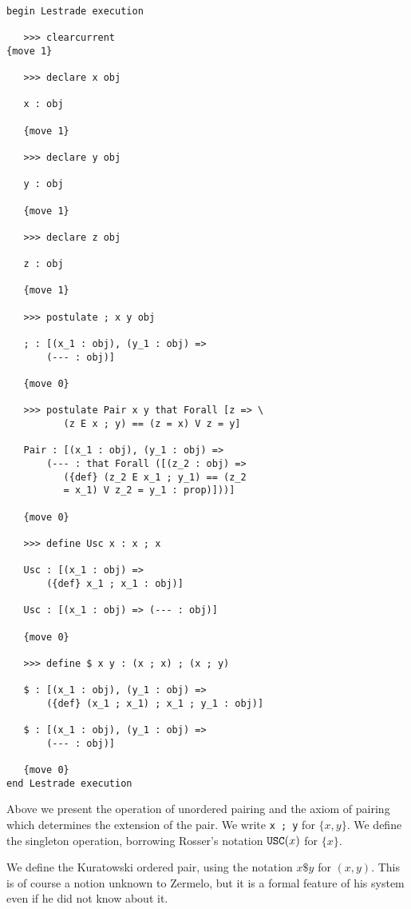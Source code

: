 \documentclass[12pt]{article}
\begin{document}
\begin{verbatim}

begin Lestrade execution

   >>> clearcurrent
{move 1}

   >>> declare x obj

   x : obj

   {move 1}

   >>> declare y obj

   y : obj

   {move 1}

   >>> declare z obj

   z : obj

   {move 1}

   >>> postulate ; x y obj

   ; : [(x_1 : obj), (y_1 : obj) => 
       (--- : obj)]

   {move 0}

   >>> postulate Pair x y that Forall [z => \
          (z E x ; y) == (z = x) V z = y]

   Pair : [(x_1 : obj), (y_1 : obj) => 
       (--- : that Forall ([(z_2 : obj) => 
          ({def} (z_2 E x_1 ; y_1) == (z_2 
          = x_1) V z_2 = y_1 : prop)]))]

   {move 0}

   >>> define Usc x : x ; x

   Usc : [(x_1 : obj) => 
       ({def} x_1 ; x_1 : obj)]

   Usc : [(x_1 : obj) => (--- : obj)]

   {move 0}

   >>> define $ x y : (x ; x) ; (x ; y)

   $ : [(x_1 : obj), (y_1 : obj) => 
       ({def} (x_1 ; x_1) ; x_1 ; y_1 : obj)]

   $ : [(x_1 : obj), (y_1 : obj) => 
       (--- : obj)]

   {move 0}
end Lestrade execution
\end{verbatim}

Above we present the operation of unordered pairing and the axiom of pairing which determines the extension of the pair.  We write {\tt x ; y} for $\{x,y\}$.  We define
 the singleton operation, borrowing Rosser's notation ${\tt USC}(x)$ for $\{x\}$.

We define the Kuratowski ordered pair, using the notation $x \$ y$ for $(x,y)$.  This is of course a notion unknown to Zermelo, but it is a formal feature of his system even if he did not know about it.
\end{document}
